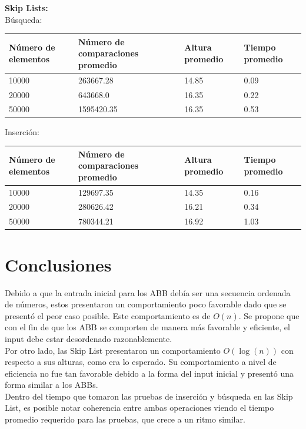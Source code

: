 \documentclass[11pt,letterpaper]{article}
\begin{document}
\textbf{Skip Lists:}\\

Búsqueda:

\begin{center}
    \begin{tabular}{| l | l | l | l |}
    \hline
    \textbf{Número de elementos} & \textbf{Número de comparaciones promedio} & \textbf{Altura promedio} & \textbf{Tiempo promedio} \\
    \hline
    10000 & 263667.28 & 14.85 & 0.09 \\
    \hline
    20000 & 643668.0 & 16.35 & 0.22 \\
    \hline
    50000 & 1595420.35 & 16.35 & 0.53 \\
    \hline
    \end{tabular}
\end{center}

Inserción:

\begin{center}
    \begin{tabular}{| l | l | l | l |}
    \hline
    \textbf{Número de elementos} & \textbf{Número de comparaciones promedio} & \textbf{Altura promedio} & \textbf{Tiempo promedio} \\
    \hline
    10000 & 129697.35 & 14.35 & 0.16 \\
    \hline
    20000 & 280626.42 & 16.21 & 0.34 \\
    \hline
    50000 & 780344.21 & 16.92 & 1.03 \\
    \hline
    \end{tabular}
\end{center}

\newpage
\section{Conclusiones}

Debido a que la entrada inicial para los ABB debía ser una secuencia ordenada de números, estos presentaron un comportamiento poco favorable dado que se presentó el peor caso posible. Este comportamiento es de $O(n)$. Se propone que con el fin de que los ABB se comporten de manera más favorable y eficiente, el input debe estar desordenado razonablemente.\\

Por otro lado, las Skip List presentaron un comportamiento $O(\log(n))$ con respecto a sus alturas, como era lo esperado. Su comportamiento a nivel de eficiencia no fue tan favorable debido a la forma del input inicial y presentó una forma similar a los ABBs.\\
Dentro del tiempo que tomaron las pruebas de inserción y búsqueda en las Skip List, es posible notar coherencia entre ambas operaciones viendo el tiempo promedio requerido para las pruebas, que crece a un ritmo similar.\\
\end{document}
